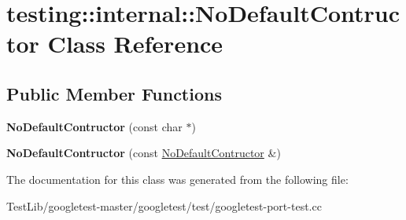 \hypertarget{classtesting_1_1internal_1_1NoDefaultContructor}{}\section{testing\+:\+:internal\+:\+:No\+Default\+Contructor Class Reference}
\label{classtesting_1_1internal_1_1NoDefaultContructor}
\subsection*{Public Member Functions}
\begin{DoxyCompactItemize}
\item 
\mbox{\label{classtesting_1_1internal_1_1NoDefaultContructor_a34c9cdf833476a9718141dcff931ba42}} 
{\bfseries No\+Default\+Contructor} (const char $\ast$)
\item 
\mbox{\label{classtesting_1_1internal_1_1NoDefaultContructor_acba74b55a8c5341808ecb5b9318eaecf}} 
{\bfseries No\+Default\+Contructor} (const \hyperlink{classtesting_1_1internal_1_1NoDefaultContructor}{No\+Default\+Contructor} \&)
\end{DoxyCompactItemize}


The documentation for this class was generated from the following file\+:\begin{DoxyCompactItemize}
\item 
Test\+Lib/googletest-\/master/googletest/test/googletest-\/port-\/test.\+cc\end{DoxyCompactItemize}
